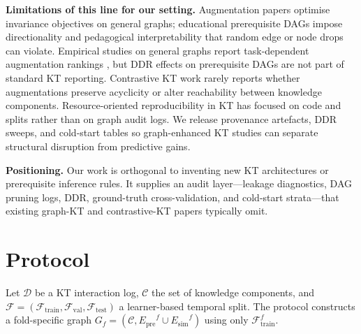 \documentclass[pdflatex,sn-basic]{sn-jnl}
\newcommand{\Epre}{\ensuremath{E_{\text{pre}}}}
\newcommand{\Esim}{\ensuremath{E_{\text{sim}}}}
\newcommand{\KCs}{knowledge components}
\newcommand{\DDR}{\textsc{DDR}}
\begin{document}
\textbf{Limitations of this line for our setting.}
Augmentation papers optimise invariance objectives on general graphs;
educational prerequisite DAGs impose directionality and pedagogical
interpretability that random edge or node drops can violate. Empirical
studies on general graphs report task-dependent augmentation rankings
\cite{zhu2020graphtsa}, but \DDR{} effects on prerequisite DAGs are not
part of standard KT reporting. Contrastive KT work rarely reports whether
augmentations preserve acyclicity or alter reachability between \KCs{}.
Resource-oriented reproducibility in KT has focused on code and splits
\cite{liu2022pykt} rather than on graph audit logs. We release provenance
artefacts, \DDR{} sweeps, and cold-start tables so graph-enhanced KT
studies can separate structural disruption from predictive gains.

\textbf{Positioning.}
Our work is orthogonal to inventing new KT architectures or prerequisite
inference rules. It supplies an audit layer---leakage diagnostics, DAG
pruning logs, \DDR{}, ground-truth cross-validation, and cold-start
strata---that existing graph-KT and contrastive-KT papers typically omit.
\section{Protocol}
\label{sec:protocol}
Let $\mathcal{D}$ be a KT interaction log, $\mathcal{C}$ the set of
\KCs{}, and $\mathcal{F}=(\mathcal{F}_{\text{train}},
\mathcal{F}_{\text{val}},\mathcal{F}_{\text{test}})$ a learner-based
temporal split. The protocol constructs a fold-specific graph
$G_f=(\mathcal{C},\Epre^f\cup\Esim^f)$ using only
$\mathcal{F}_{\text{train}}^f$.
\end{document}
